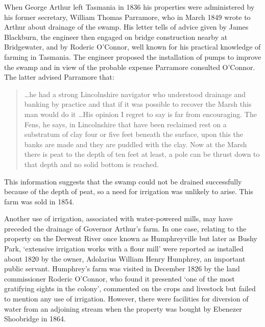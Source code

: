 When George Arthur left Tasmania in 1836 his properties were
administered by his former secretary, William Thomas Parramore, who in
March 1849 wrote to Arthur about drainage of the swamp.  His letter
tells of advice given by James Blackburn, the engineer then engaged on
bridge construction nearby at Bridgewater, and by Roderic O'Connor,
well known for his practical knowledge of farming in Tasmania.  The
engineer proposed the installation of pumps to improve the swamp and
in view of the probable expense Parramore consulted O'Connor.  The
latter advised Parramore that:
\begin{quote}
	\ldots he had a strong Lincolnshire navigator who understood
	drainage and banking by practice and that if it was possible
	to recover the Marsh this man would do it \ldots His opinion I
	regret to say is far from encouraging.  The Fens, he says, in
	Lincolnshire that have been reclaimed rest on a substratum of
	clay four or five feet beneath the surface, upon this the
	banks are made and they are puddled with the clay.  Now at the
	Marsh there is peat to the depth of ten feet at least, a pole
	can be thrust down to that depth and no solid bottom is
	reached.
\end{quote}
This information suggests that the swamp could not be drained
successfully because of the depth of peat, so a need for irrigation
was unlikely to arise.  This farm was sold in 1854.

Another use of irrigation, associated with water-powered mills, may
have preceded the drainage of Governor Arthur's farm.  In one case,
relating to the property on the Derwent River once known as
Humphreyville but later as Bushy Park, `extensive irrigation works
with a flour mill' were reported as installed about 1820 by the owner,
Adolarius William Henry Humphrey, an important public
servant.  Humphrey's farm was visited in December
1826 by the land commissioner Roderic O'Connor, who found it presented
`one of the most gratifying sights in the colony', commented on the
crops and livestock but failed to mention any use of
irrigation.  However, there were
facilities for diversion of water from an adjoining stream when the
property was bought by Ebenezer Shoobridge in 1864.

